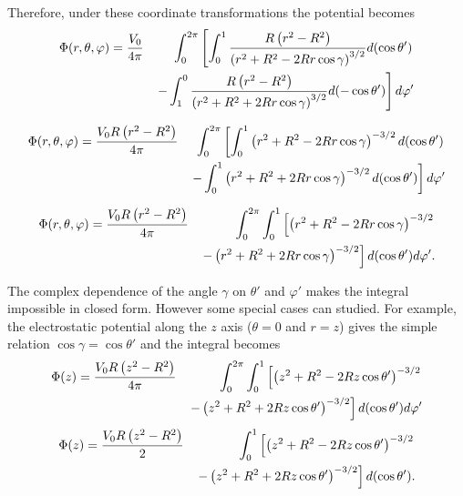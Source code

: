 Therefore, under these coordinate transformations the potential becomes
\begin{eqnarray}
\Phi (r, \theta, \varphi ) &= \frac{V_0}{4 \pi}   & \int_0^{2\pi}  \left[ \int_0^1   \frac{ R \left(  r^2- R^2 \right) }{  \left( r^2+ R^2- 2 Rr \cos \gamma \right)^{3/2} } d(\cos \theta ')\right. \notag \\ 
& & \left. -\int_{1}^0   \frac{ R \left(  r^2- R^2 \right) }{  \left( r^2+ R^2+ 2 Rr \cos \gamma \right)^{3/2} }  d(-\cos \theta ') \right] d \varphi ' \notag 
\end{eqnarray}

\begin{eqnarray}
\Phi (r, \theta, \varphi ) &= \frac{V_0 R \left(  r^2- R^2 \right)}{4 \pi}   & \int_0^{2\pi}  \left[ \int_0^1   \left( r^2+ R^2- 2 Rr \cos \gamma \right)^{-3/2}  d(\cos \theta ')\right. \notag \\ 
& & \left. -\int_{0}^1  \left( r^2+ R^2+ 2 Rr \cos \gamma \right)^{-3/2}  d(\cos \theta ') \right] d \varphi ' \notag 
\end{eqnarray}

\begin{eqnarray}
\Phi (r, \theta, \varphi ) &= \frac{V_0 R \left(  r^2- R^2 \right)}{4 \pi}   & \int_0^{2\pi}  \int_0^1   \left[ \left( r^2+ R^2- 2 Rr \cos \gamma \right)^{-3/2}  \right. \notag \\ 
& & \left. -  \left( r^2+ R^2+ 2 Rr \cos \gamma \right)^{-3/2}  \right]d(\cos \theta ')  d \varphi ' . \label{eq:GenerealSpherePotential}
\end{eqnarray}

The complex dependence of the angle $\gamma$ on $\theta '$ and $\varphi '$ makes the integral impossible in closed form. However some special cases can studied. For example, the electrostatic potential along the $z$ axis ($\theta = 0$  and $r=z$) gives the simple relation $\cos \gamma = \cos \theta '$ and the integral becomes
\begin{eqnarray}
\Phi (z ) &= \frac{V_0 R \left(  z^2- R^2 \right)}{4 \pi}   & \int_0^{2\pi}  \int_0^1   \left[ \left( z^2+ R^2- 2 Rz \cos \theta ' \right)^{-3/2}  \right. \notag \\ 
& & \left. -  \left( z^2+ R^2+ 2 Rz \cos \theta' \right)^{-3/2}  \right]d(\cos \theta ')  d \varphi ' \notag 
\end{eqnarray}
\begin{eqnarray}
\Phi (z ) &= \frac{V_0 R \left(  z^2- R^2 \right)}{2}   &   \int_0^1   \left[ \left( z^2+ R^2- 2 Rz \cos \theta ' \right)^{-3/2}  \right. \notag \\ 
& & \left. -  \left( z^2+ R^2+ 2 Rz \cos \theta' \right)^{-3/2}  \right]d(\cos \theta ') \notag .
\end{eqnarray}

